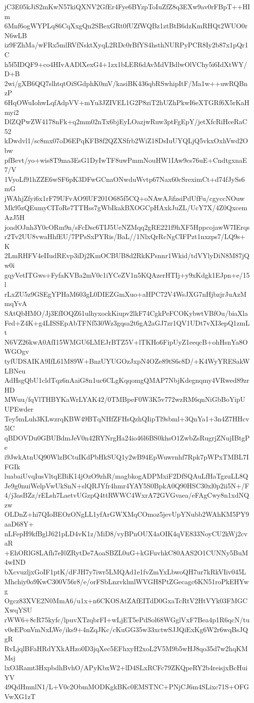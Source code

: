 jC3E05kJiS2mKwN57kiQXNV2GfEr4Fye6BYzpToIuZfZ8q3EXw9av0rFBpT++HIm
6Mnf6ogWYPLq86CqXxgQn2SBexGRt0fUZfWQBz1ztBtB6dzKmRHQt2WUO0rN6wLB
iz9FZhMa/wFRx5mlRVfNsktXyqL2RDc0rBfYS4hsthNURPyPCR8Iy2b87x1pQr1C
h5f5IDQF9+co4HIvAADlXexG4+1zx1bLER6dAvMdVBdlwOlVChy5i6IdXtWY/D+B
2wi/gXB6QQ7slhtqtOiSGdphK0mV/kasiBK436qbRSwhipItF/Ma1w++uwRQBnzP
6HqOWuIohwLqfAdpVV+mYu3JZIVEL1G2P8ziT2hUZhPkwI6eXTGRf6X5rKaHmyi2
DlZQPwZW4178nFk+q2mm02nTx6bjEyLOazjwRuw3ptFgEpY/jetXfcRiHceRaC52
kDwdvl1/sc8mx07oD6EPqKFB8f2QZXSfrb2WiZ18DsIuUYQLjQ5vkxOxhVwd2Obw
pfBevt/yo+wis8T9ma3EsG1DyIwTF8uwPmmNouHW1IAw9cs76uE+CndtgxnaE7/V
1VyoLf91hZZE6wSF6pK3DFwGCnaONwduWvtp67Nax60cSreximCt+d74fJySs6mG
jWAhjZfyi6x1rF79UFvAO9lUF201O685f5CQ+oNAwAJifzsiPdUfFu/cgyccNOuw
Mk95zQEumyCIToRe7TTHss7gWbIkakBXOGCpHAxkJuZL/UcY7X/4Z0QxcemAzJ5H
joadOJnh3Y0cORm9n/sFcDsc6TIJ5UeNZMqq2gRE221f9hXF5HppcojawW7IErqs
r2Tv2UU8vwaHhfEU/7PPsSxPYRis/BaL//1NlxQrRcNgCIFPzt1nxzps7/LQ9s+K
2LmRHFV4eIIudREvp3iDj2KmOCBUB8d2RkKPsnnr1Wkid/tdVYlyDiN8M87jQw0i
gqyVetITGws+FyfaKVBa2mV0c1iYCeZV1n5KQAzerHTIj+y9xKdgk1EJpn+e/15l
rLxZU5z9GSEgYPHaM603gL0DIEZGmXuo+aHPC72V4WsJXG7nHjbzjrJuAzMmqYvA
SAtQbHMO/Jj3EfIOQZ61ulhyxockKiupv2lkF74CgkPeFCOKybwtVBfOu/biaXla
Fed+Z4K+g4LISSEpAbTFNf530Wz3gqsa2t6gA2aGJ7zr1QV1UDt7vXI3epQ1zmLt
N6VZ26kwA0AfI15WMGU6LMEJrBTZ5V+lTKHo6FipUyZ1eeqcB+ohHsnYa8OWGOgv
tyfUDSAIKA9IfL61M89W+BnzUYUGOzJxpN4OZe89tS6c8D/+K4WyYRESakWLBNeu
AdHsgQbU1cldTqz6nAaiG8n1uc6CLgKqqomgQMAP7NbjKdegnqmy4VRwed89zrHD
MWuu/fqVlTHBYKaWrLYAK42/0TMBpeF0W3K5v772wzRM6qnNiGbBoYipUUPEwder
Tey5mLuh3KLwzrqKBW49BTqNHfZFHsQzhQIipTl9sbml+3QnYa1+3n4Z7HHcv5lC
qBDOVDu0GBUBdmJeV0n42RYNrgHa24io46l6BS0khsO1ZwbZsRugrjZNujIBtgPe
i9JwkAtnUQ90WlzBCtuIKdPbHkSUQ1y2wB94EpWuwrnhf7Rpk7pWPxTMBL7IFGIk
luabaiUvqIusVltqEBiK14jOzO9zhR/magbkogADPMxiF2DfSQAuLfHaTgzuLL8Q
Je9g0nuiWelpVwUkSnN+slQRJYfr4hmr4YAY5S0BpkA0Q90HSC30xl0p2ii5N+/F
4/j3asBZz/rELsh7LaetvUGzpQ4ttRWWC4WxrA72GVGvaea/eFAgCwy8n1xdNQzw
OLDnZ+hi7QIoBEOzONgLL1yfArGWXMqCOmoz5jevUpYNubb2WAhKM5PY9aaD68Y+
nLFepH9kfBglJ621pLD4vK1z/MiD8/vyBPnOUX4aOIK4qVE833NoyCU2kWj2cvaR
+EhORlG8LAfh7eI0ZRytDe7AoaSBZL0uG+kGFuvhkC80AAS2O1CUNNy5BuM4wIND
bXcvuzljxGoIF1ptK/dFJH7y7iwr5LMQAd1e1fvZmYxLbwoQH7ur7kRkVIiv045L
Mhchiy0o9KwC300V56r8/e/orFSbLnzvklmlWVGH8PtZGecagc6KN51roPkEHYwg
Ogcz83XVE2N0MmA6/u1x+n6CKOSAtZAfEITdD0GxaTcRtV2HtVYk03FMGCXwqYSU
rWW6+8cR75kyfc/lpuvXTzqbrFI+wLjET5ePdSol68WGglVxF7Bea4p1R6qcN/tu
v0eEPonVmNxLWe/iks9+4nZqJKc/cKuGG35w33xctwSJJQiExKg6W2r6wqBsJQgR
RvLjqlBFaHRdYXkAHzo0D3jqXec5EFhxyH2xoL2V5M9b5wHJ8qo35d7w2hqKMMsj
lxO3Ramt3HxpbdhBvhO/APyKbxW2+lD4SLxRCFc79ZKQpeRY2b4reisjxBcHuiYV
49QdHmnlN1/L+V0c2ObmMODKgkBKc0EMSTNC+PNjCJ6m4SLixc71S+OFGVwXG1zT
